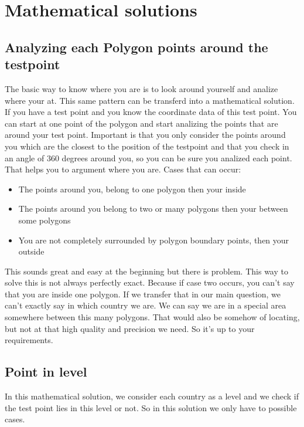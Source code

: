\documentclass[12pt,a4paper]{scrreprt}
\begin{document}
\newpage
\tableofcontents
\newpage


\chapter{Mathematical solutions}
\section{Analyzing each Polygon points around the testpoint}
\begin{flushleft}
The basic way to know where you are is to look around yourself and analize where your at. This same pattern can be transferd into a mathematical solution. If you have a test point and you know the coordinate data of this test point. You can start at one point of the polygon and start analizing the points that are around your test point. Important is that you only consider the points around you which are the closest to the position of the testpoint and that you check in an angle of 360 degrees around you, so you can be sure you analized each point.\\
That helps you to argument where you are. Cases that can occur:
\vspace{0.1cm}
\begin{itemize}
\item The points around you, belong to one polygon then your inside
\item The points around you belong to two or many polygons then your between some polygons
\item You are not completely surrounded by polygon boundary points, then your outside
\end{itemize}
\vspace{0.1cm}
This sounds great and easy at the beginning but there is problem. This way to solve this is not always perfectly exact. Because if case two occurs, you can't say that you are inside one polygon. If we transfer that in our main question, we can't exactly say in which country we are. We can say we are in a special area somewhere between this many polygons. That would also be somehow of locating, but not at that high quality and precision we need. So it's up to your requirements.
\end{flushleft}


\newpage
\section{Point in level}
In this mathematical solution, we consider each country as a level and we check if the test point lies in this level or not. So in this solution we only have to possible cases.
\end{document}
